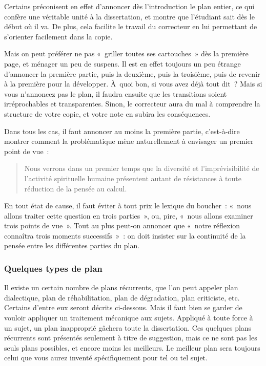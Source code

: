 \documentclass[a4paper]{article}
\begin{document}
Certains préconisent en effet d'annoncer dès l'introduction le plan
entier, ce qui confère une véritable unité à la dissertation, et montre
que l'étudiant sait dès le début où il va. De plus, cela facilite le
travail du correcteur en lui permettant de s'orienter facilement dans la
copie.

Mais on peut préférer ne pas « griller toutes ses cartouches » dès la
première page, et ménager un peu de suspens. Il est en effet toujours un
peu étrange d'annoncer la première partie, puis la deuxième, puis la
troisième, puis de revenir à la première pour la développer. À quoi bon,
si vous avez déjà tout dit ? Mais si vous n'annoncez pas le plan, il
faudra ensuite que les transitions soient irréprochables et
transparentes. Sinon, le correcteur aura du mal à comprendre la
structure de votre copie, et votre note en subira les conséquences.

Dans tous les cas, il faut annoncer au moins la première partie,
c'est-à-dire montrer comment la problématique mène naturellement à
envisager un premier point de vue :

\begin{quote}
Nous verrons dans un premier temps que la diversité et
l'imprévisibilité de l'activité spirituelle humaine présentent autant
de résistances à toute réduction de la pensée au calcul.
\end{quote}

En tout état de cause, il faut éviter à tout prix le lexique du
boucher : « nous allons traiter cette question en trois parties », ou,
pire, « nous allons examiner trois points de vue ». Tout au plus peut-on
annoncer que « notre réflexion connaîtra trois moments successifs » : on
doit insister sur la continuité de la pensée entre les différentes
parties du plan.
\subsubsection{Quelques types de plan}
\label{sec-2-4-2}


Il existe un certain nombre de plans récurrents, que l'on peut appeler
plan dialectique, plan de réhabilitation, plan de dégradation, plan
criticiste, etc. Certains d'entre eux seront décrits ci-dessous. Mais il
faut bien se garder de vouloir appliquer un traitement mécanique aux
sujets. Appliqué à toute force à un sujet, un plan inapproprié gâchera
toute la dissertation. Ces quelques plans récurrents sont présentés
seulement à titre de suggestion, mais ce ne sont pas les seuls plans
possibles, et encore moins les meilleurs. Le meilleur plan sera toujours
celui que vous aurez inventé spécifiquement pour tel ou tel sujet.
\end{document}
